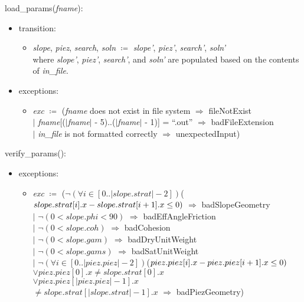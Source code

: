 \documentclass[12pt, titlepage]{article}
\begin{document}
load\_params(\textit{fname}):
\begin{itemize}
	\item transition:
	\begin{itemize}
		\item[] \textit{slope}, \textit{piez}, 
		\textit{search}, 
		\textit{soln} $\coloneqq$  \textit{slope'}, 
		\textit{piez'}, \textit{search'}, 
		\textit{soln'}\\ 
		where \textit{slope'}, 
		\textit{piez'}, \textit{search'}, and 
		\textit{soln'}
		are populated based on the contents of \textit{in\_file}.
	\end{itemize}

	\item exceptions:
	\begin{itemize}
		\item[] \textit{exc} $\coloneqq$ (\textit{fname} does not exist in file 
		system $\Rightarrow$ fileNotExist\\
		$|$ \textit{fname}[($|$\textit{fname}$|$ - 5)..($|$\textit{fname}$|$ - 
		1)] = ``.out'' $\Rightarrow$ badFileExtension\\
		$|$ \textit{in\_file} is not formatted correctly $\Rightarrow$ 
		unexpectedInput)
	\end{itemize}
\end{itemize}

\noindent verify\_params():
\begin{itemize}
	\item exceptions:
	\begin{itemize}
		\item[] \textit{exc} $\coloneqq$ ($\lnot (\forall i \in 
		[0..|slope.strat|-2])$($slope.strat[i].x -\\ 
		slope.strat[i+1].x \leq 0)$ 
		$\Rightarrow$ badSlopeGeometry\\
		$|$ $\lnot (0 < slope.phi < 90)$ $\Rightarrow$ 
		badEffAngleFriction\\
		$|$ $\lnot (0 < slope.coh)$ $\Rightarrow$ 
		badCohesion\\
		$|$ $\lnot (0 < slope.gam)$ $\Rightarrow$ 
		badDryUnitWeight\\
		$|$ $\lnot (0 < slope.gams)$ $\Rightarrow$ 
		badSatUnitWeight\\
		$|$ $\lnot (\forall i \in 
		[0..|piez.piez|-2])$($piez.piez[i].x -\\ 
		piez.piez[i+1].x \leq 0)$\\ $\lor piez.piez[0].x \neq 
		slope.strat[0].x$ \\$\lor 
		piez.piez[|piez.piez|-1].x$\\ $\neq 
		slope.strat[|slope.strat|-1].x$ $\Rightarrow$ 
		badPiezGeometry)\\
	\end{itemize}
\end{itemize}
\end{document}
